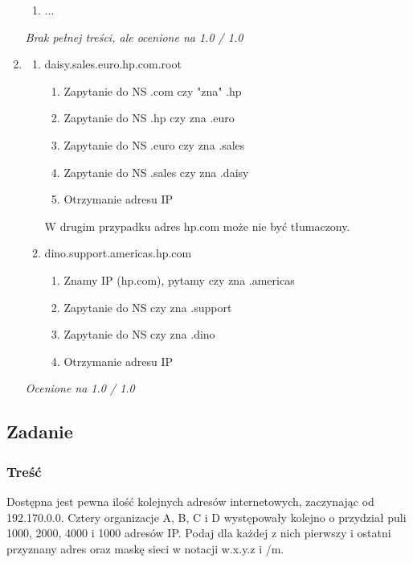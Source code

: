 \documentclass[a4paper,twoside]{article}
\begin{document}
\begin{enumerate}[A]
\begin{enumerate}[1]
		\item ...
	\end{enumerate}
	\small{ \emph{Brak pełnej treści, ale ocenione na 1.0 / 1.0}}
	\item
	\begin{enumerate}
		\item daisy.sales.euro.hp.com.root
		\begin{enumerate}[1]
			\item Zapytanie do NS .com czy "zna" .hp
			\item Zapytanie do NS .hp czy zna .euro
			\item Zapytanie do NS .euro czy zna .sales
			\item Zapytanie do NS .sales czy zna .daisy
			\item Otrzymanie adresu IP
		\end{enumerate}
		W drugim przypadku adres hp.com może nie być tłumaczony.
		\item dino.support.americas.hp.com
		\begin{enumerate}[1]
			\item Znamy IP (hp.com), pytamy czy zna .americas
			\item Zapytanie do NS czy zna .support
			\item Zapytanie do NS czy zna .dino
			\item Otrzymanie adresu IP
		\end{enumerate}
	\end{enumerate}
	\small{ \emph{Ocenione na 1.0 / 1.0}}
\end{enumerate}
\subsection{Zadanie}
\subsubsection{Treść}
Dostępna jest pewna ilość kolejnych adresów internetowych, zaczynając od 192.170.0.0. Cztery organizacje A, B, C i D występowały kolejno o przydział puli 1000, 2000, 4000 i 1000 adresów IP. Podaj dla każdej z nich pierwszy i ostatni przyznany adres oraz maskę sieci w notacji w.x.y.z i /m.
\end{document}
